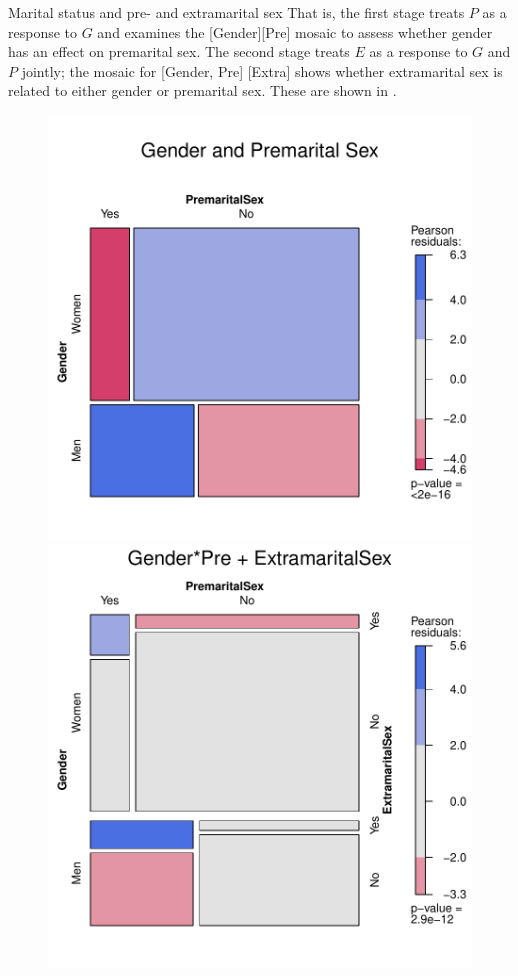 \documentclass[11pt]{book}
\renewenvironment{knitrout}{\small\renewcommand{\baselinestretch}{.85}}{} %
\begin{document}
\begin{Example}[marital1]{Marital status and pre- and extramarital sex}
That is, the first stage  treats $P$ as a
response to $G$ and examines the [Gender][Pre] mosaic to assess
whether gender has an effect on premarital sex.  The second stage
treats $E$ as a response to $G$ and $P$ jointly;  the
mosaic for [Gender, Pre] [Extra] shows whether extramarital sex
is related to either gender or premarital sex.  These are shown
in .

\begin{knitrout}
\color{fgcolor}\begin{kframe}
\begin{alltt}
\hlstd{(} \hlopt{:}\hlstd{),} \hlstd{=}\hlstd{,}
                 \hlstd{=} \hlstd{)}

\hlstd{(} \hlopt{:}\hlstd{),}
        \hlstd{=} \hlopt{~} \hlopt{*}  \hlopt{+} 
        \hlstd{=} \hlstd{)}
\end{alltt}
\end{kframe}\begin{figure}[!htbp]


\centerline{\includegraphics[width=.49\textwidth]{ch05/fig/presex21} 
\includegraphics[width=.49\textwidth]{ch05/fig/presex22} }


\end{figure}
\end{knitrout}
\end{Example}
\end{document}
